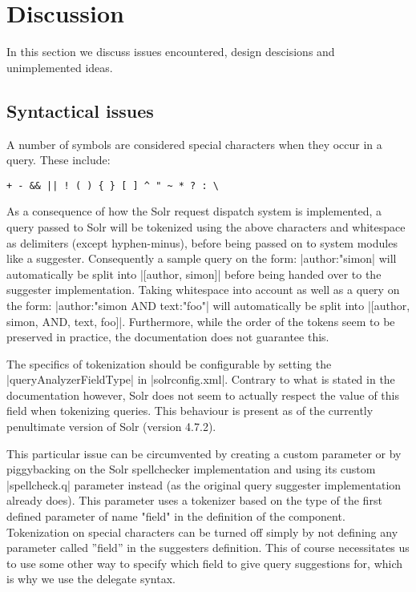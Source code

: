 \section{Discussion}\label{discussion}

In this section we discuss issues encountered, design descisions and unimplemented ideas.

\subsection{Syntactical issues}

A number of symbols are considered special characters when they occur in a query. These include\cite{QUERY}:
\begin{verbatim}
+ - && || ! ( ) { } [ ] ^ " ~ * ? : \
\end{verbatim}

As a consequence of how the Solr request dispatch system is implemented, a query passed to Solr will be tokenized using the above characters and whitespace as delimiters (except hyphen-minus), before being passed on to system modules like a suggester.
Consequently a sample query on the form: |author:"simon| will automatically be split into |[author, simon]|
before being handed over to the suggester implementation.
Taking whitespace into account as well as a query on the form: |author:"simon AND text:"foo"| will automatically be split into |[author, simon, AND, text, foo]|.
Furthermore, while the order of the tokens seem to be preserved in practice, the documentation does not guarantee this.

The specifics of tokenization should be configurable by setting the |queryAnalyzerFieldType| in |solrconfig.xml|. Contrary to what is stated in the documentation however, Solr does not seem to actually respect the value of this field when tokenizing queries. This behaviour is present as of the currently penultimate version of Solr (version 4.7.2).

This particular issue can be circumvented by creating a custom parameter or by piggybacking on the Solr spellchecker implementation and using its custom |spellcheck.q| parameter instead (as the original query suggester implementation already does).
This parameter uses a tokenizer based on the type of the first defined parameter of name "field" in the definition of the component.\cite{FIELDTYPE}
Tokenization on special characters can be turned off simply by not defining any parameter called ''field'' in the suggesters definition. This of course necessitates us to use some other way to specify which field to give query suggestions for, which is why we use the delegate syntax.

